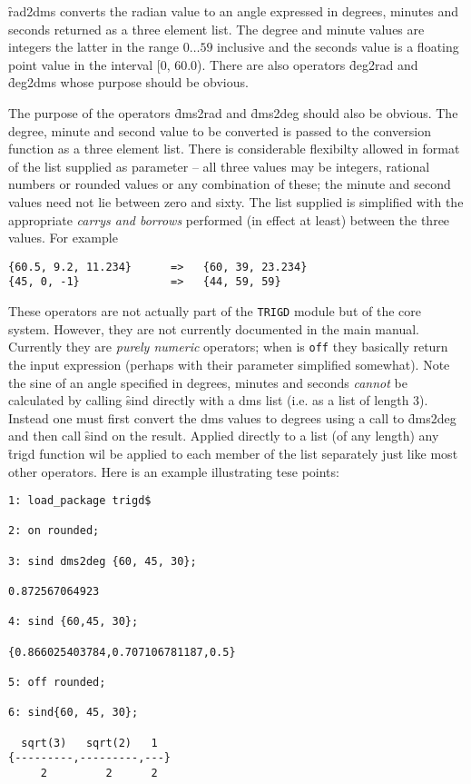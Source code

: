 \f{rad2dms} converts the radian value to an angle expressed in degrees, minutes and seconds returned as a three element list.  The degree and minute values are integers the latter in the range $0 \ldots 59$ inclusive and the seconds value is  a floating point value in the interval [0, 60.0).
There are also operators \f{deg2rad} and \f{deg2dms} whose purpose should be obvious.


The purpose of the operators  \f{dms2rad} and \f{dms2deg} should  also be obvious.  The degree, minute and second value to be converted is passed to the conversion function as a three element list.  There is considerable flexibilty allowed in  format of the list supplied as parameter -- all three values may be integers, rational numbers or rounded values or any combination of these; the minute and second values need not lie between zero and sixty.  The list supplied is simplified with the appropriate \textit{carrys and borrows} performed (in effect at least) between the three values.  For example
\begin{verbatim} 
{60.5, 9.2, 11.234}      =>   {60, 39, 23.234}
{45, 0, -1}              =>   {44, 59, 59}
\end{verbatim}

These operators are not actually part of the \texttt{TRIGD} module but of the {\REDUCE} core system. However, they are not currently documented in the main manual.  Currently they are \emph{purely numeric} operators; when  is \texttt{off} they basically return the input expression (perhaps with their parameter simplified somewhat).  
\fi
Note the sine of an angle specified in degrees, minutes and seconds \emph{cannot} be calculated by calling \f{sind} directly with a dms list (i.e. as a list of length 3).  Instead one must first convert the dms values to degrees using a call to \f{dms2deg} and then call \f{sind} on the result.  Applied directly to a list (of any length) any \f{trigd} function wil be applied to each member of the list separately just like most other {\REDUCE} operators. Here is an example illustrating tese points:
\begin{verbatim}
1: load_package trigd$

2: on rounded;

3: sind dms2deg {60, 45, 30};

0.872567064923

4: sind {60,45, 30};

{0.866025403784,0.707106781187,0.5}

5: off rounded;

6: sind{60, 45, 30};

  sqrt(3)   sqrt(2)   1
{---------,---------,---}
     2         2      2

\end{verbatim}
 
